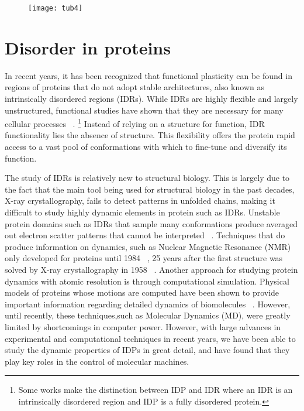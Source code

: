 \begin{figure}[h!]
\centering
\texttt{[image: tub4]}
\label{fig:tub4}
\end{figure}

\section{Disorder in proteins}

In recent years, it has been recognized that functional plasticity  can be found in regions of proteins that  do not adopt stable architectures, also known as intrinsically disordered regions (IDRs). While IDRs are highly flexible and largely unstructured, functional studies have shown that they are necessary for many cellular processes ~\cite{wright2015intrinsically}.  \footnote{Some works make the distinction between IDP and IDR where an IDR is an intrinsically disordered region and IDP is a fully disordered protein.} Instead of relying on a structure for function, IDR functionality lies the absence of structure. This flexibility offers the protein rapid access to a vast pool of conformations with which to fine-tune and diversify its function.  

The study of IDRs is relatively new to structural biology. This is largely due to the fact that the main tool being used for structural biology in the past decades, X-ray crystallography, fails to detect patterns in unfolded chains, making it difficult to study highly dynamic elements in protein such as IDRs. Unstable protein domains such as IDRs that sample many conformations produce averaged out electron scatter patterns that cannot be interpreted ~\cite{putnam2007x}. Techniques that  do produce information  on dynamics,  such as Nuclear Magnetic Resonance (NMR) only developed for proteins  until 1984 ~\cite{wuthrich2001way}, 25 years after the first structure was solved by X-ray crystallography  in 1958 ~\cite{kendrew1958three}.  Another approach for studying protein dynamics with atomic resolution is through computational simulation.  Physical models of proteins whose motions are computed \silico have been shown to provide important information regarding detailed dynamics of biomolecules ~\cite{karplus2002molecular}. However, until recently, these techniques,such as Molecular Dynamics (MD), were greatly limited by shortcomings in computer power. However, with large advances  in experimental  and computational techniques  in recent years, we have been able to study the dynamic properties  of IDPs in great detail, and have found that  they play key roles in the control of molecular machines.

